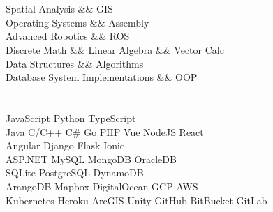 \documentclass[]{hackathons}
\begin{document}
\begin{minipage}[t]{0.32\textwidth} 


\section{}

\small


\section{}
Spatial Analysis \&\& GIS \\
Operating Systems \&\& Assembly \\
Advanced Robotics \&\& ROS \\
Discrete Math \&\& Linear Algebra \&\& Vector Calc\\
Data Structures \&\& Algorithms \\
Database System Implementations \&\& OOP \\
\small


\section{}
JavaScript \textbullet{} Python \textbullet{} TypeScript \\
Java \textbullet{} C/C++ \textbullet{} C\# \textbullet{} Go \textbullet{} PHP 
\smallbreak
Vue \textbullet{} NodeJS \textbullet{} React \\
Angular \textbullet{} Django \textbullet{} Flask \textbullet{} Ionic \\
ASP.NET
\smallbreak
MySQL \textbullet{} MongoDB \textbullet{} OracleDB \\
SQLite \textbullet{} PostgreSQL \textbullet{} DynamoDB \\
ArangoDB
\smallbreak
Mapbox \textbullet{} DigitalOcean \textbullet{} GCP \textbullet{} AWS \\
Kubernetes \textbullet{} Heroku \textbullet{} ArcGIS \textbullet{} Unity
\smallbreak
GitHub \textbullet{} BitBucket \textbullet{} GitLab 
\small


\end{minipage}
\end{document}
